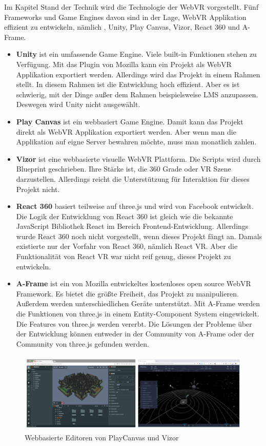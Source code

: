  Im Kapitel Stand der Technik wird die Technologie der WebVR vorgestellt. Fünf Frameworks und Game Engines davon sind in der Lage, WebVR Applikation effizient zu entwickeln, nämlich , Unity, Play Canvas, Vizor, React 360 und A-Frame.
 
 \begin{itemize}
     \item \textbf{Unity} ist ein umfassende Game Engine. Viele built-in Funktionen stehen zu Verfügung. Mit das Plugin von Mozilla kann ein Projekt als WebVR Applikation exportiert werden. Allerdings wird das Projekt in einem Rahmen stellt. In diesem Rahmen ist die Entwicklung hoch effizient. Aber es ist schwierig, mit der Dinge außer dem Rahmen beispielsweise LMS anzupassen. Deswegen wird Unity nicht ausgewählt.
     \item \textbf{Play Canvas} ist ein webbasiert Game Engine. Damit kann das Projekt direkt als WebVR Applikation exportiert werden. Aber wenn man die Applikation auf eigne Server bewahren möchte, muss man monatlich zahlen.
     \item \textbf{Vizor} ist eine webbasierte visuelle WebVR Plattform. Die Scripts wird durch Blueprint geschrieben. Ihre Stärke ist, die 360 Grade oder VR Szene darzustellen. Allerdings reicht die Unterstützung für Interaktion für dieses Projekt nicht.
     \item \textbf{React 360} basiert teilweise auf three.js und wird von Facebook entwickelt. Die Logik der Entwicklung von React 360 ist gleich wie die bekannte JavaScript Bibliothek React im Bereich Frontend-Entwicklung. Allerdings wurde React 360 noch nicht vorgestellt, wenn dieses Projekt fängt an. Damals existierte nur der Vorfahr von React 360, nämlich React VR. Aber die Funktionalität von React VR war nicht reif genug, dieses Projekt zu entwickeln.
     \item \textbf{A-Frame} ist ein von Mozilla entwickeltes kostenloses open source WebVR Framework. Es bietet die größte Freiheit, das Projekt zu manipulieren. Außerdem werden unterschiedlichen Geräte unterstützt. Mit A-Frame werden die Funktionen von three.js in einem Entity-Component System eingewickelt. Die Features von three.js werden vererbt. Die Lösungen der Probleme über der Entwicklung können entweder in der Community von A-Frame oder der Community von three.js gefunden werden.
 \end{itemize}
 
\begin{figure}[ht]
\centering
\includegraphics[width=\textwidth]{images/playCanvasVizor.png}
\caption[Webbasierte Engine]{Webbasierte Editoren von PlayCanvas und Vizor}
\label{fig:Webbasierte Engine}
\end{figure}

